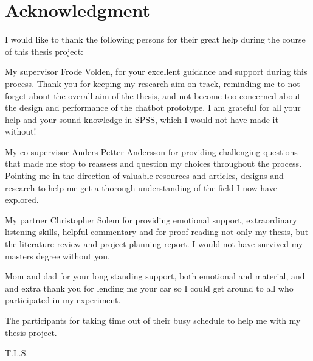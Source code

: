 \chapter*{Acknowledgment}
I would like to thank the following persons for their great help during the course of this thesis project:

\vspace{5mm}


My supervisor Frode Volden, for your excellent guidance and support during this process. Thank you for keeping my research aim on track, reminding me to not forget about the overall aim of the thesis, and not become too concerned about the design and performance of the chatbot prototype. I am grateful for all your help and your sound knowledge in SPSS, which I would not have made it without!

\vspace{5mm}

My co-supervisor Anders-Petter Andersson for providing challenging questions that made me stop to reassess and question my choices throughout the process. Pointing me in the direction of valuable resources and articles, designs and research to help me get a thorough understanding of the field I now have explored.

\vspace{5mm}

My partner Christopher Solem for providing emotional support, extraordinary listening skills, helpful commentary and for proof reading not only my thesis, but the literature review and project planning report. I would not have survived my masters degree without you.

\vspace{5mm}

Mom and dad for your long standing support, both emotional and material, and and extra thank you for lending me your car so I could get around to all who participated in my experiment.

\vspace{5mm}

The participants for taking time out of their busy schedule to help me with my thesis project.

\begin{flushright}
T.L.S.\\[1pc]
\end{flushright}